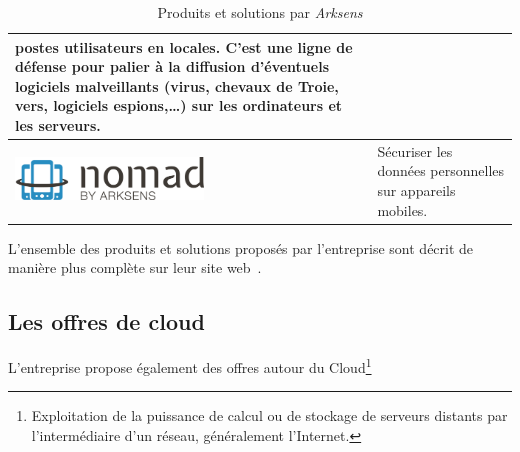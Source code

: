 \documentclass[a4paper,10pt, twoside]{report}
\begin{document}
\begin{spacing}{1.2}
\begin{table}[h!]
\begin{tabular}{m{6cm}m{6cm}}
    postes utilisateurs en locales. C'est une ligne de d\'efense pour palier
    \`a la diffusion d'\'eventuels logiciels malveillants (virus, chevaux de
    Troie, vers, logiciels espions,\ldots{}) sur les ordinateurs et les
    serveurs.\\
    \hline
    \includegraphics[width=5cm, fbox]{produits/nomad.png} & S\'ecuriser les
    donn\'ees personnelles sur appareils mobiles.\\
    \hline
  \end{tabular}
  \caption{\label{tabProduits} Produits et solutions par \textit{Arksens}}
\end{table}

L'ensemble des produits et solutions propos\'es par l'entreprise sont d\'ecrit
de mani\`ere plus compl\`ete sur leur site web~\cite{refArksens}.

\subsection{Les offres de cloud}
L'entreprise propose \'egalement des offres autour du Cloud\footnote{
Exploitation de la puissance de calcul ou de stockage de serveurs distants
par l'interm\'ediaire d'un r\'eseau, g\'en\'eralement l'Internet.}


\end{spacing}
\end{document}
